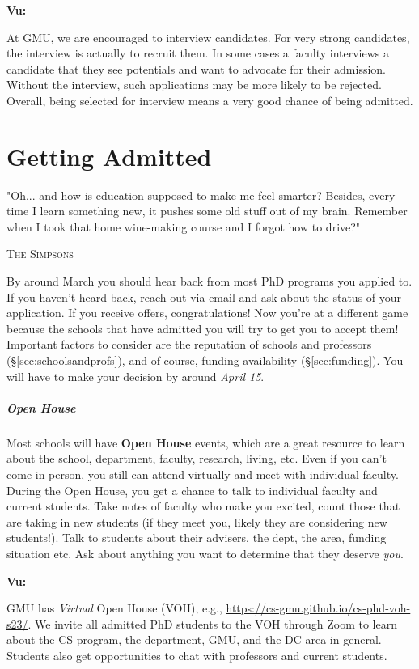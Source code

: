 \documentclass[oneside,11pt]{memoir}
\newenvironment{commentbox}[1][]{
\small
    \begin{mybox}
    {\small \textbf{#1}}
 }{
   \end{mybox}
}
\begin{document}
\begin{commentbox}[Vu:]
At GMU, we are encouraged to interview candidates. For very strong candidates, the interview is actually to recruit them.  In some cases a faculty interviews a candidate that they see potentials and want to advocate for their admission. Without the interview, such applications may be more likely to be rejected. Overall, being selected for interview means a very good chance of being admitted.
\end{commentbox}

\chapter{Getting Admitted}\label{sec:accepted}

\epigraph{"Oh... and how is education supposed to make me feel smarter? Besides, every time I learn something new, it pushes some old stuff out of my brain. Remember when I took that home wine-making course and I forgot how to drive?"}{\textsc{The Simpsons}}

By around March you should hear back from most PhD programs you applied to. If you haven't heard back, reach out via email and ask about the status of your application.
If you receive offers, congratulations!  Now you're at a different game because the schools that have admitted you will try to get you to accept them!  Important factors to consider are the reputation of schools and professors (\S\ref{sec:schoolsandprofs}), and of course, funding availability (\S\ref{sec:funding}). You will have to make your decision by around \emph{April 15}.

\paragraph{Open House} Most schools will have \textbf{Open House} events, which are a great resource to learn about the school, department, faculty, research, living, etc. Even if you can't come in person, you still can attend virtually and meet with individual faculty.
During the Open House, you get a chance to talk to individual faculty and current students.  Take notes of faculty who make you excited, count those that are taking in new students (if they meet you, likely they are considering new students!).  Talk to students about their advisers, the dept, the area, funding situation etc.  Ask about anything you want to determine that they deserve \emph{you}.

\begin{commentbox}[Vu:]
GMU has \emph{Virtual} Open House (VOH), e.g., \url{https://cs-gmu.github.io/cs-phd-voh-s23/}. We invite all admitted PhD students to the VOH through Zoom to learn about the CS program, the department, GMU, and the DC area in general. Students also get opportunities to chat with professors and current students.
\end{commentbox}
\end{document}
